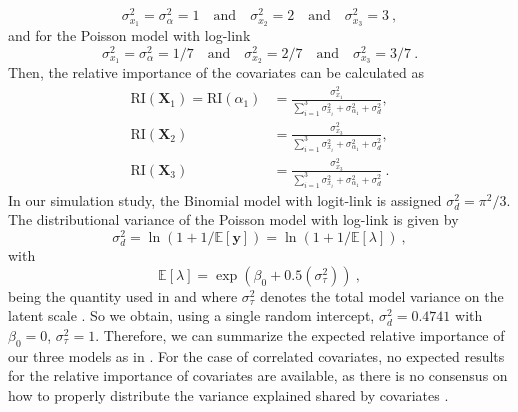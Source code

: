 \begin{equation}
    \sigma_{x_1}^2 = \sigma_{\alpha}^2  = 1 \quad \text{and} \quad \sigma_{x_2}^2 = 2 \quad \text{and} \quad \sigma_{x_3}^2 = 3 \ ,
\end{equation}
and for the Poisson model with log-link
\begin{equation}
    \sigma_{x_1}^2 = \sigma_{\alpha}^2  = 1/7 \quad \text{and} \quad \sigma_{x_2}^2 = 2/7 \quad \text{and} \quad \sigma_{x_3}^2 = 3/7 \ .
\end{equation}
Then, the relative importance of the covariates can be calculated as
\begin{equation}
    \begin{aligned}
        \text{RI}(\mathbf{X}_{1})  = \text{RI}(\alpha_1)  &= \frac{\sigma_{x_1}^2}{\sum_{i=1}^{3}\sigma_{x_i}^2 +\sigma_{\alpha_1}^2  + \sigma_d^2}, \\
        \text{RI}(\mathbf{X}_2) &= \frac{\sigma_{x_3}^2}{\sum_{i=1}^{3}\sigma_{x_i}^2 +\sigma_{\alpha_1}^2 +  \sigma_d^2}, \\
        \text{RI}(\mathbf{X}_3) &= \frac{\sigma_{x_3}^2}{\sum_{i=1}^{3}\sigma_{x_i}^2 +\sigma_{\alpha_1}^2 +  \sigma_d^2} \ .
    \end{aligned}
\end{equation}
In our simulation study, the Binomial model with logit-link is assigned $\sigma^2_d=\pi^2/3$. The distributional variance of the Poisson model with log-link is given by 
\begin{equation}
    \sigma_d^2 = \ln (1 + 1/\mathbb{E}[\mathbf{y}]) = \ln (1 + 1/\mathbb{E}[\lambda]) \ ,
\end{equation}
with
\begin{equation}
    \label{eq:lambda}
    \mathbb{E}[\lambda]=\exp\left(\beta_0 + 0.5 (\sigma^2_{\tau})\right) \ ,
\end{equation}
being the quantity used in  and where $\sigma^2_{\tau}$ denotes the total model variance on the latent scale \citep{nakagawa2017}. So we obtain, using a single random intercept, $\sigma_{d}^2=0.4741$ with $\beta_0=0$, $\sigma^2_{\tau}=1$. Therefore, we can summarize the expected relative importance of our three models as in . For the case of correlated covariates, no expected results for the relative importance of covariates are available, as there is no consensus on how to properly distribute the variance explained shared by covariates \citep{gromping_relaimpo}.
